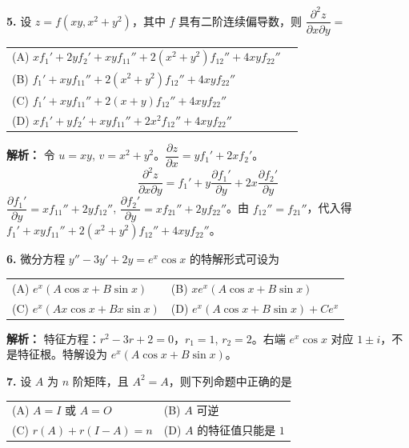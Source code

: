 \vspace{8pt}

\textbf{5.} 设 $z = f(xy, x^2+y^2)$，其中 $f$ 具有二阶连续偏导数，则 $\dfrac{\partial^2 z}{\partial x \partial y} =$
\begin{center}
\begin{tabular}{ll}
(A) $xf_1' + 2yf_2' + xy f_{11}'' + 2(x^2+y^2)f_{12}'' + 4xy f_{22}''$ \\[4pt]
(B) $f_1' + xy f_{11}'' + 2(x^2+y^2)f_{12}'' + 4xy f_{22}''$ \\[4pt]
(C) $f_1' + xy f_{11}'' + 2(x+y)f_{12}'' + 4xy f_{22}''$ \\[4pt]
(D) $xf_1' + yf_2' + xy f_{11}'' + 2x^2 f_{12}'' + 4xy f_{22}''$
\end{tabular}
\end{center}

\ifshowsolutions\par\noindent\textbf{解析：} 令 $u=xy$, $v=x^2+y^2$。$\dfrac{\partial z}{\partial x} = y f_1' + 2x f_2'$。
\[
\frac{\partial^2 z}{\partial x \partial y} = f_1' + y\frac{\partial f_1'}{\partial y} + 2x\frac{\partial f_2'}{\partial y}
\]
$\dfrac{\partial f_1'}{\partial y} = x f_{11}'' + 2y f_{12}''$, $\dfrac{\partial f_2'}{\partial y} = x f_{21}'' + 2y f_{22}''$。由 $f_{12}''=f_{21}''$，代入得
$f_1' + xy f_{11}'' + 2(x^2+y^2)f_{12}'' + 4xy f_{22}''$。\else \answerarea \fi

\vspace{8pt}

\textbf{6.} 微分方程 $y'' - 3y' + 2y = e^x \cos x$ 的特解形式可设为
\begin{center}
\begin{tabular}{ll}
(A) $e^x(A\cos x + B\sin x)$ & (B) $xe^x(A\cos x + B\sin x)$ \\[6pt]
(C) $e^x(Ax\cos x + Bx\sin x)$ & (D) $e^x(A\cos x + B\sin x) + C e^x$
\end{tabular}
\end{center}

\ifshowsolutions\par\noindent\textbf{解析：} 特征方程：$r^2-3r+2=0$，$r_1=1$, $r_2=2$。右端 $e^x\cos x$ 对应 $1\pm i$，不是特征根。特解设为 $e^x(A\cos x+B\sin x)$。\else \answerarea \fi

\vspace{8pt}

\textbf{7.} 设 $A$ 为 $n$ 阶矩阵，且 $A^2 = A$，则下列命题中正确的是
\begin{center}
\begin{tabular}{ll}
(A) $A = I$ 或 $A = O$ & (B) $A$ 可逆 \\[4pt]
(C) $r(A) + r(I-A) = n$ & (D) $A$ 的特征值只能是 $1$
\end{tabular}
\end{center}

